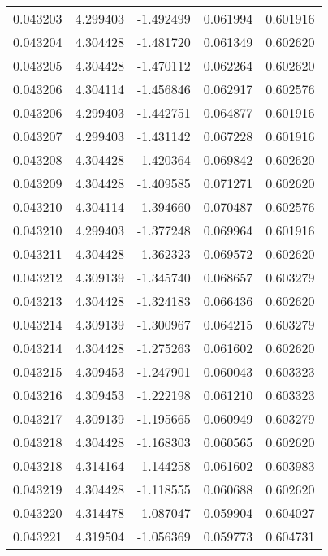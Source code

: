 \begin{tabular}{lrrrr}
0.043203    &  4.299403 & -1.492499 &  0.061994 &             0.601916 \\
0.043204    &  4.304428 & -1.481720 &  0.061349 &             0.602620 \\
0.043205    &  4.304428 & -1.470112 &  0.062264 &             0.602620 \\
0.043206    &  4.304114 & -1.456846 &  0.062917 &             0.602576 \\
0.043206    &  4.299403 & -1.442751 &  0.064877 &             0.601916 \\
0.043207    &  4.299403 & -1.431142 &  0.067228 &             0.601916 \\
0.043208    &  4.304428 & -1.420364 &  0.069842 &             0.602620 \\
0.043209    &  4.304428 & -1.409585 &  0.071271 &             0.602620 \\
0.043210    &  4.304114 & -1.394660 &  0.070487 &             0.602576 \\
0.043210    &  4.299403 & -1.377248 &  0.069964 &             0.601916 \\
0.043211    &  4.304428 & -1.362323 &  0.069572 &             0.602620 \\
0.043212    &  4.309139 & -1.345740 &  0.068657 &             0.603279 \\
0.043213    &  4.304428 & -1.324183 &  0.066436 &             0.602620 \\
0.043214    &  4.309139 & -1.300967 &  0.064215 &             0.603279 \\
0.043214    &  4.304428 & -1.275263 &  0.061602 &             0.602620 \\
0.043215    &  4.309453 & -1.247901 &  0.060043 &             0.603323 \\
0.043216    &  4.309453 & -1.222198 &  0.061210 &             0.603323 \\
0.043217    &  4.309139 & -1.195665 &  0.060949 &             0.603279 \\
0.043218    &  4.304428 & -1.168303 &  0.060565 &             0.602620 \\
0.043218    &  4.314164 & -1.144258 &  0.061602 &             0.603983 \\
0.043219    &  4.304428 & -1.118555 &  0.060688 &             0.602620 \\
0.043220    &  4.314478 & -1.087047 &  0.059904 &             0.604027 \\
0.043221    &  4.319504 & -1.056369 &  0.059773 &             0.604731 \\

\end{tabular}
